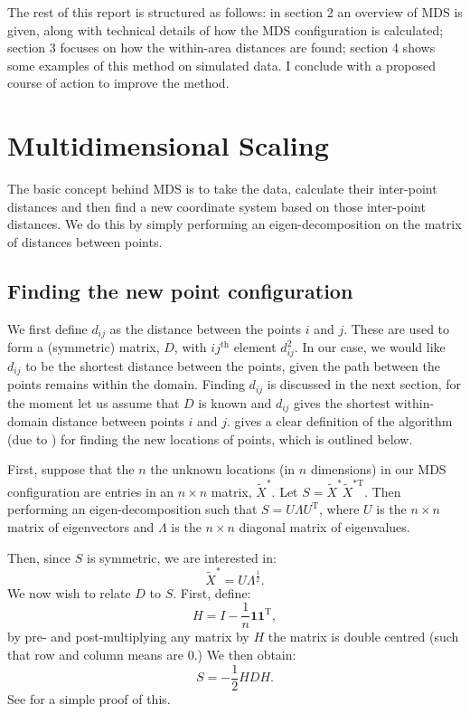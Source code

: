 \documentclass[a4paper,10pt]{article}
\newcommand{\tr}[1]{#1^{\text{T}}}
\newcommand{\cross}{\times}
\begin{document}
The rest of this report is structured as follows: in section 2 an overview of MDS is given, along with technical details of how the MDS configuration is calculated; section 3 focuses on how the within-area distances are found; section 4 shows some examples of this method on simulated data. I conclude with a proposed course of action to improve the method.

\section{Multidimensional Scaling}

The basic concept behind MDS is to take the data, calculate their inter-point distances and then find a new coordinate system based on those inter-point distances. We do this by simply performing an eigen-decomposition on the matrix of distances between points.

\subsection{Finding the new point configuration}

We first define $d_{ij}$ as the distance between the points $i$ and $j$. These are used to form a (symmetric) matrix, $D$, with $ij^{\text{th}}$ element $d^2_{ij}$. In our case, we would like $d_{ij}$ to be the shortest distance between the points, given the path between the points remains within the domain. Finding $d_{ij}$ is discussed in the next section, for the moment let us assume that $D$ is known and $d_{ij}$ gives the shortest within-domain distance between points $i$ and $j$. \cite{diaconis08} gives a clear definition of the algorithm (due to \cite{schoenberg35}) for finding the new locations of points, which is outlined below.

First, suppose that the $n$ the unknown locations (in $n$ dimensions) in our MDS configuration are entries in an $n \times n$ matrix, $\tilde{X}^*$. Let $S=\tilde{X}^{*} \tilde{X}^{*\text{T}} $. Then performing an eigen-decomposition such that $S=U\Lambda\tr{U}$, where $U$ is the $n \cross n$ matrix of eigenvectors and $\Lambda$ is the $n \cross n$ diagonal matrix of eigenvalues.

Then, since $S$ is symmetric, we are interested in:
\begin{equation}
\tilde{X}^*=U\Lambda^{\frac{1}{2}}.
\end{equation}
We now wish to relate $D$ to $S$. First, define:
\begin{equation}
H = I-\frac{1}{n}\mathbf{1}\tr{\mathbf{1}},
\end{equation}
by pre- and post-multiplying any matrix by $H$ the matrix is double centred (such that row and column means are 0.) We then obtain:
\begin{equation}
S = -\frac{1}{2}HDH.
\end{equation}
See \cite{diaconis08} for a simple proof of this.
\end{document}
